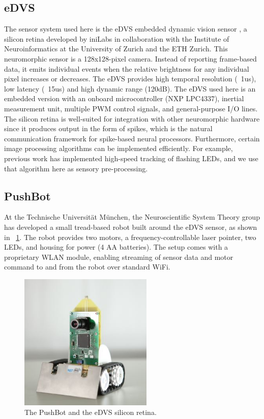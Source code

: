 \documentclass[conference]{IEEEtran}
\begin{document}
\subsection{eDVS}
The sensor system used here is the eDVS embedded dynamic vision 
sensor \cite{conradt2009embedded}, a silicon retina developed by iniLabs in 
collaboration with the Institute of Neuroinformatics at the University of 
Zurich and the ETH Zurich. This neuromorphic sensor is a 128x128-pixel camera. 
Instead of reporting frame-based data, it emits individual events when the 
relative brightness for any individual pixel increases or decreases. The eDVS 
provides high temporal resolution (~1us), low latency (~15us) and high dynamic 
range (120dB). The eDVS used here is an embedded version with an onboard 
microcontroller (NXP LPC4337), inertial measurement unit, multiple PWM control 
signals, and general-purpose I/O lines. The silicon retina is well-suited for 
integration with other neuromorphic hardware since it produces output in the 
form of spikes, which is the natural communication framework for spike-based 
neural processors. Furthermore, certain image processing algorithms can be 
implemented efficiently. For example, previous work \cite{muller2011miniature} 
has implemented high-speed tracking of flashing LEDs, and we use that algorithm 
here as sensory pre-processing.


\subsection{PushBot}
At the Technische Universit{\"a}t M{\"u}nchen, the Neuroscientific
System Theory group has developed a small tread-based robot built around the 
eDVS sensor, as shown in \figurename~\ref{fig_sim}. The robot provides two motors, a frequency-controllable laser pointer, two LEDs, and housing for power (4 AA batteries). The setup comes with a proprietary WLAN module, enabling streaming of sensor data and motor command to and from the robot over standard WiFi.

\begin{figure}[!t]
\centering
\includegraphics[width=2.5in]{Pushbot1CroppedCropped.jpg}
\caption{The PushBot and the eDVS silicon retina.}
\label{fig_sim}
\end{figure}
\end{document}
